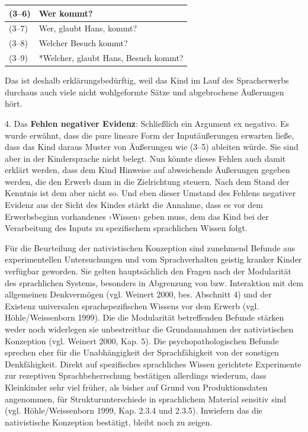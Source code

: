 \documentclass[
  letterpaper,
]{scrbook}
\begin{document}
\begin{longtable}[]{@{}ll@{}}
\toprule()
(3--6) & Wer kommt? \\
\midrule()
\endhead
(3--7) & Wer, glaubt Hans, kommt? \\
(3--8) & Welcher Besuch kommt? \\
(3--9) & *Welcher, glaubt Hans, Besuch kommt? \\
\bottomrule()
\end{longtable}

Das ist deshalb erklärungsbedürftig, weil das Kind im Lauf des
Spracherwerbs durchaus auch viele nicht wohlgeformte Sätze und
abgebrochene Äußerungen hört.

4. Das \textbf{Fehlen negativer Evidenz}: Schließlich ein Argument ex
negativo. Es wurde erwähnt, dass die pure lineare Form der
Inputäußerungen erwarten ließe, dass das Kind daraus Muster von
Äußerungen wie (3--5) ableiten würde. Sie sind aber in der Kindersprache
nicht belegt. Nun könnte dieses Fehlen auch damit erklärt werden, dass
dem Kind Hinweise auf abweichende Äußerungen gegeben werden, die den
Erwerb dann in die Zielrichtung steuern. Nach dem Stand der Kenntnis ist
dem aber nicht so. Und eben dieser Umstand des Fehlens negativer Evidenz
aus der Sicht des Kindes stärkt die Annahme, dass es vor dem
Erwerbsbeginn vorhandenes ›Wissen‹ geben muss, dem das Kind bei der
Verarbeitung des Inputs zu spezifischem sprachlichen Wissen folgt.

Für die Beurteilung der nativistischen Konzeption sind zunehmend Befunde
aus experimentellen Untersuchungen und vom Sprachverhalten geistig
kranker Kinder verfügbar geworden. Sie gelten hauptsächlich den Fragen
nach der Modularität des sprachlichen Systems, besonders in Abgrenzung
von bzw. Interaktion mit dem allgemeinen Denkvermögen (vgl. Weinert
2000, bes. Abschnitt 4) und der Existenz universalen sprachspezifischen
Wissens vor dem Erwerb (vgl. Höhle/Weissenborn 1999). Die die
Modularität betreffenden Befunde stärken weder noch widerlegen sie
unbestreitbar die Grundannahmen der nativistischen Konzeption (vgl.
Weinert 2000, Kap. 5). Die psychopathologischen Befunde sprechen eher
für die Unabhängigkeit der Sprachfähigkeit von der sonstigen
Denkfähigkeit. Direkt auf spezifisches sprachliches Wissen gerichtete
Experimente zur rezeptiven Sprachbeherrschung bestätigen allerdings
wiederum, dass Kleinkinder sehr viel früher, als bisher auf Grund von
Produktionsdaten angenommen, für Strukturunterschiede in sprachlichem
Material sensitiv sind (vgl. Höhle/Weissenborn 1999, Kap. 2.3.4 und
2.3.5). Inwiefern das die nativistische Konzeption bestätigt, bleibt
noch zu zeigen.
\end{document}
